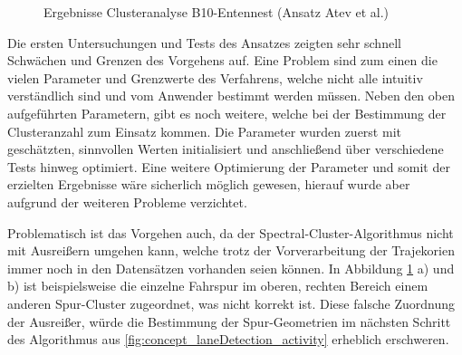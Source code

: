 \begin{figure}
    \centering
    \qquad \qquad
    \caption{Ergebnisse Clusteranalyse B10-Entennest (Ansatz Atev et al.)}
    \label{fig:real_results_atev1}
\end{figure}

Die ersten Untersuchungen und Tests des Ansatzes zeigten sehr schnell Schwächen und Grenzen des Vorgehens auf.
Eine Problem sind zum einen die vielen Parameter und Grenzwerte des Verfahrens, welche nicht alle intuitiv
verständlich sind und vom Anwender bestimmt werden müssen. Neben den oben aufgeführten Parametern, gibt es
noch weitere, welche bei der Bestimmung der Clusteranzahl zum Einsatz kommen. Die Parameter wurden
zuerst mit geschätzten, sinnvollen Werten initialisiert und anschließend über verschiedene Tests hinweg optimiert.
Eine weitere Optimierung der Parameter und somit der erzielten Ergebnisse wäre sicherlich möglich gewesen,
hierauf wurde aber aufgrund der weiteren Probleme verzichtet.

Problematisch ist das Vorgehen auch, da der Spectral-Cluster-Algorithmus nicht mit Ausreißern umgehen kann,
welche trotz der Vorverarbeitung der Trajekorien immer noch in den Datensätzen vorhanden seien können.
In Abbildung \ref{fig:real_results_atev1} a) und b) ist beispielsweise die einzelne Fahrspur im oberen, rechten Bereich
einem anderen Spur-Cluster zugeordnet, was nicht korrekt ist.
Diese falsche Zuordnung der Ausreißer, würde die Bestimmung der Spur-Geometrien im nächsten Schritt des
Algorithmus aus \ref{fig:concept_laneDetection_activity} erheblich erschweren.

